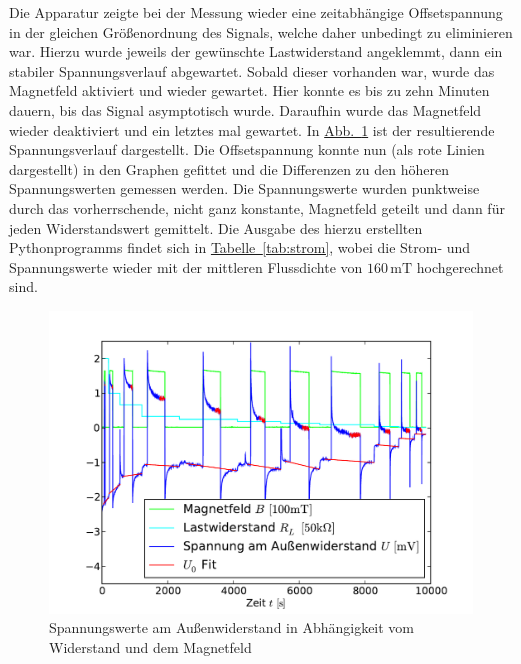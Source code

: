 \documentclass[11pt]{scrartcl}
\newcommand{\unit}[1]{\ensuremath{\,\mathrm{#1}}} %
\newcommand{\abb}[1]{\hyperref[#1]{Abb.~\ref{#1}}}
\newcommand{\tab}[1]{\hyperref[#1]{Tabelle~\ref{#1}}}
\begin{document}
Die Apparatur zeigte bei der Messung wieder eine zeitabhängige Offsetspannung in der gleichen Größenordnung des Signals, welche daher unbedingt zu eliminieren war.
Hierzu wurde jeweils der gewünschte Lastwiderstand angeklemmt, dann ein stabiler Spannungsverlauf abgewartet.
Sobald dieser vorhanden war, wurde das Magnetfeld aktiviert und wieder gewartet.
Hier konnte es bis zu zehn Minuten dauern, bis das Signal asymptotisch wurde.
Daraufhin wurde das Magnetfeld wieder deaktiviert und ein letztes mal gewartet.
In \abb{rohdatenstrom} ist der resultierende Spannungsverlauf dargestellt.
Die Offsetspannung konnte nun (als rote Linien dargestellt) in den Graphen gefittet und die Differenzen zu den höheren Spannungswerten gemessen werden.
Die Spannungswerte wurden punktweise durch das vorherrschende, nicht ganz konstante, Magnetfeld geteilt und dann für jeden Widerstandswert gemittelt.
Die Ausgabe des hierzu erstellten Pythonprogramms findet sich in \tab{tab:strom}, wobei die Strom- und Spannungswerte wieder mit der mittleren Flussdichte von $160\unit{mT}$ hochgerechnet sind.

\begin{figure}[ht]
\begin{center}
\includegraphics[width=1.0\textwidth]{images/rohdaten_strom.pdf}
\end{center}
\vspace{-1.5\baselineskip}
\caption{Spannungswerte am Außenwiderstand in Abhängigkeit vom Widerstand und dem Magnetfeld}
\label{rohdatenstrom}
\end{figure}
\end{document}
